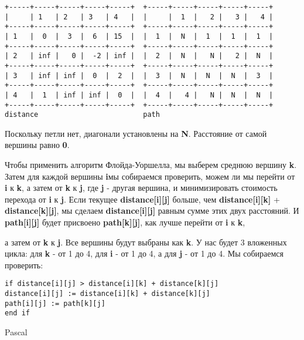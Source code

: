 \vspace{\baselineskip}
\begin{tcolorbox}
\begin{verbatim}
+-----+-----+-----+-----+-----+  +-----+-----+-----+-----+-----+
|     | 1   | 2   | 3   | 4   |  |     |  1  |   2 |   3 |   4 |
+-----+-----+-----+-----+-----+  +-----+-----+-----+-----+-----+
| 1   |  0  |  3  |  6  | 15  |  |  1  |  N  |  1  |  1  |  1  |
+-----+-----+-----+-----+-----+  +-----+-----+-----+-----+-----+
| 2   | inf |   0 |  -2 | inf |  |  2  |  N  |   N |   2 |  N  |
+-----+-----+-----+-----+-----+  +-----+-----+-----+-----+-----+
| 3   | inf | inf |  0  |  2  |  |  3  |  N  |  N  |  N  |  3  |
+-----+-----+-----+-----+-----+  +-----+-----+-----+-----+-----+
| 4   |  1  | inf | inf |  0  |  |  4  |   4 |   N |  N  |  N  |
+-----+-----+-----+-----+-----+  +-----+-----+-----+-----+-----+
distance                         path

\end{verbatim}
\end{tcolorbox}

Поскольку петли нет, диагонали установлены на \textbf{N}. Расстояние от самой вершины равно \textbf{0}.

Чтобы применить алгоритм Флойда-Уоршелла, мы выберем среднюю вершину \textbf{k}. Затем для каждой вершины \textbf{i}мы собираемся проверить, можем ли мы перейти от \textbf{i} к \textbf{k}, а затем от  \textbf{k} к \textbf{j}, где \textbf{j} - другая вершина, и минимизировать стоимость перехода от \textbf{i} к \textbf{j}. Если текущее \textbf{distance[i][j]} больше, чем \textbf{distance[i][k]} + \textbf{distance[k][j]}, мы сделаем \textbf{distance[i][j]} равным сумме этих двух расстояний. И \textbf{path[i][j]} будет присвоено \textbf{path[k][j]}, как лучше перейти от \textbf{i} к \textbf{k},


\vspace{\baselineskip}
а затем от \textbf{k} к \textbf{j}. Все вершины будут выбраны как \textbf{k}. У нас будет 3 вложенных цикла: для \textbf{k} - от 1 до 4, для \textbf{i} - от 1 до 4, а для \textbf{j} - от 1 до 4. Мы собираемся проверить:

\vspace{\baselineskip}
\begin{verbatim}
if distance[i][j] > distance[i][k] + distance[k][j]
distance[i][j] := distance[i][k] + distance[k][j]
path[i][j] := path[k][j]
end if
\end{verbatim}{Pascal}

